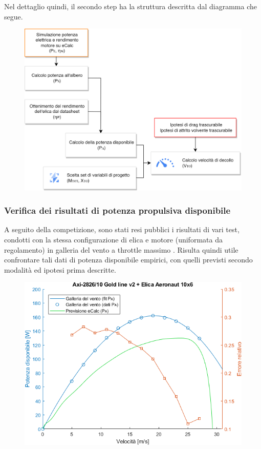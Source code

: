\documentclass[12pt]{article}
\begin{document}
\noindent
Nel dettaglio quindi, il secondo step ha la struttura descritta dal diagramma che segue.
\begin{figure}[h]
	\centering
	\includegraphics[width=11.6cm]{img/dim-vto-v2}
\end{figure}

\subsubsection{Verifica dei risultati di potenza propulsiva disponibile}
A seguito della competizione, sono stati resi pubblici i risultati di vari test, condotti con la stessa configurazione di elica e motore (uniformata da regolamento) in galleria del vento a throttle massimo \cite{windtunnel}. Risulta quindi utile confrontare tali dati di potenza disponibile empirici, con quelli previsti secondo modalità ed ipotesi prima descritte.

\begin{figure}[h]
	\centering
	\includegraphics[width=13cm]{img/plot-PA-crop}
\end{figure}
\end{document}

